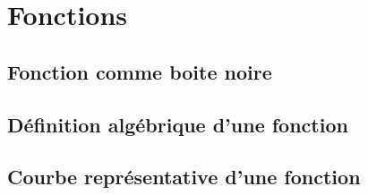
\chapter{Fonctions}

\section{Fonction comme boite noire}

\section{Définition algébrique d'une fonction}

\section{Courbe représentative d'une fonction}